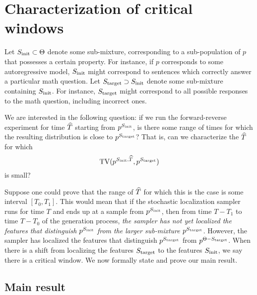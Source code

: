 
\section{Characterization of critical windows}\label{sec:master}

Let $S_{\mathrm{init}}\subset\Theta$ denote some sub-mixture, corresponding to a sub-population of $p$ that possesses a certain property. For instance, if $p$ corresponds to some autoregressive model, $S_{\mathrm{init}}$ might correspond to sentences which correctly answer a particular math question. Let $S_{\mathrm{target}}\supset S_{\mathrm{init}}$ denote some sub-mixture containing $S_{\mathrm{init}}$. For instance, $S_{\mathrm{target}}$ might correspond to all possible responses to the math question, including incorrect ones.

We are interested in the following question: if we run the forward-reverse experiment for time $\widehat{T}$ starting from $p^{S_{\mathrm{init}}}$, is there some range of times for which the resulting distribution is close to $p^{S_{\mathrm{target}}}$? That is, can we characterize the $\widehat{T}$ for which
\begin{equation}
    \TV(\modrevlaw{\Sinit}{\wh{T}}{}, p^{\Send})
\end{equation}
is small?

Suppose one could prove that the range of $\widehat{T}$ for which this is the case is some interval $[T_0, T_1]$. This would mean that if the stochastic localization sampler runs for time $T$ and ends up at a sample from $p^{S_{\mathrm{init}}}$, then from time $T - T_1$ to time $T - T_0$ of the generation process, \emph{the sampler has not yet localized the features that distinguish $p^{S_{\mathrm{init}}}$ from the larger sub-mixture $p^{S_{\mathrm{target}}}$}. However, the sampler has localized the features that distinguish $p^{S_{\mathrm{target}}}$ from $p^{\Theta-S_{\mathrm{target}}}$. When there is a shift from localizing the features $S_{\mathrm{target}}$ to the features $S_{\mathrm{init}}$, we say there is a critical window. We now formally state and prove our main result.  

\subsection{Main result} 


